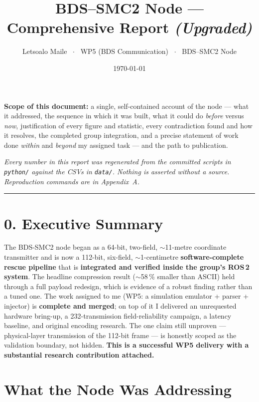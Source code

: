 \documentclass[11pt,a4paper]{article}
\title{\vspace{-1.2em}\textbf{BDS--SMC2 Node --- Comprehensive Report \textit{(Upgraded)}}}
\author{Letsoalo Maile \, $\cdot$ \, WP5 (BDS Communication) \, $\cdot$ \, BDS--SMC2 Node}
\date{\today}
\begin{document}
\maketitle
\thispagestyle{empty}

\begin{callout}
\textbf{Scope of this document:} a single, self-contained account of the node --- what it
addressed, the sequence in which it was built, what it could do \emph{before} versus
\emph{now}, justification of every figure and statistic, every contradiction found and how
it resolves, the completed group integration, and a precise statement of work done
\emph{within} and \emph{beyond} my assigned task --- and the path to publication.

\smallskip
\textit{Every number in this report was regenerated from the committed scripts in
\texttt{python/} against the CSVs in \texttt{data/}. Nothing is asserted without a source.
Reproduction commands are in Appendix~A.}
\end{callout}

\tableofcontents
\vspace{1em}
\hrule

\section*{0. Executive Summary}

The BDS-SMC2 node began as a 64-bit, two-field, $\sim$11-metre coordinate transmitter and
is now a 112-bit, six-field, $\sim$1-centimetre \textbf{software-complete rescue pipeline}
that is \textbf{integrated and verified inside the group's ROS\,2 system}. The headline
compression result ($\sim$58\,\% smaller than ASCII) held through a full payload redesign,
which is evidence of a robust finding rather than a tuned one. The work assigned to me
(WP5: a simulation emulator + parser + injector) is \textbf{complete and merged}; on top of
it I delivered an unrequested hardware bring-up, a 232-transmission field-reliability
campaign, a latency baseline, and original encoding research. The one claim still unproven
--- physical-layer transmission of the 112-bit frame --- is honestly scoped as the
validation boundary, not hidden. \textbf{This is a successful WP5 delivery with a
substantial research contribution attached.}

\section{What the Node Was Addressing}
\end{document}
